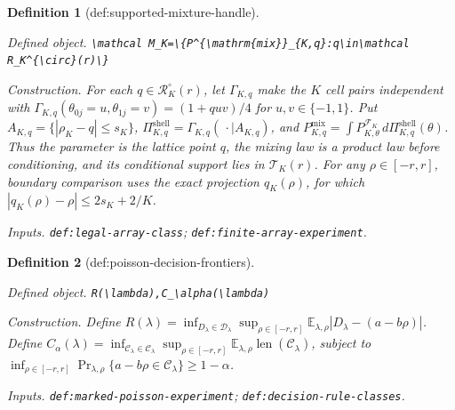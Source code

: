 \documentclass{article}
\newtheorem{definition}{Definition}
\begin{document}
\begin{definition}[def:supported-mixture-handle]\label{def:supported-mixture-handle}
\par\smallskip\noindent\emph{Defined object.} \texttt{\textbackslash{}\allowbreak{}mathcal M\_\allowbreak{}K=\allowbreak{}\textbackslash{}\allowbreak{}\{P\textasciicircum{}\{\textbackslash{}\allowbreak{}mathrm\{mix\}\allowbreak{}\}\allowbreak{}\_\allowbreak{}\{K,\allowbreak{}q\}\allowbreak{}:\allowbreak{}q\textbackslash{}\allowbreak{}in\textbackslash{}\allowbreak{}mathcal R\_\allowbreak{}K\textasciicircum{}\{\textbackslash{}\allowbreak{}circ\}\allowbreak{}(r)\textbackslash{}\allowbreak{}\}\allowbreak{}}
\par\smallskip\noindent\emph{Construction.} For each \(q\in\mathcal R_K^{\circ}(r)\), let \(\Gamma_{K,q}\) make the \(K\) cell pairs independent with \(\Gamma_{K,q}(\theta_{0j}=u,\theta_{1j}=v)=(1+quv)/4\) for \(u,v\in\{-1,1\}\). Put \(A_{K,q}=\{|\rho_K-q|\le s_K\}\), \(\Pi_{K,q}^{\mathrm{shell}}=\Gamma_{K,q}(\,\cdot\mid A_{K,q})\), and \(P^{\mathrm{mix}}_{K,q}=\int P^{\mathcal F_K}_{K,\theta}\,d\Pi_{K,q}^{\mathrm{shell}}(\theta)\). Thus the parameter is the lattice point \(q\), the mixing law is a product law before conditioning, and its conditional support lies in \(\mathcal T_K(r)\). For any \(\rho\in[-r,r]\), boundary comparison uses the exact projection \(q_K(\rho)\), for which \(|q_K(\rho)-\rho|\le 2s_K+2/K\).
\par\smallskip\noindent\emph{Inputs.} \texttt{def:\allowbreak{}legal-\allowbreak{}array-\allowbreak{}class}; \texttt{def:\allowbreak{}finite-\allowbreak{}array-\allowbreak{}experiment}.
\end{definition}

\begin{definition}[def:poisson-decision-frontiers]\label{def:poisson-decision-frontiers}
\par\smallskip\noindent\emph{Defined object.} \texttt{R(\textbackslash{}\allowbreak{}lambda),\allowbreak{}C\_\allowbreak{}\textbackslash{}\allowbreak{}alpha(\textbackslash{}\allowbreak{}lambda)}
\par\smallskip\noindent\emph{Construction.} Define \(R(\lambda)=\inf_{D_{\lambda}\in\mathscr D_{\lambda}}\sup_{\rho\in[-r,r]}\mathbb E_{\lambda,\rho}|D_{\lambda}-(a-b\rho)|\). Define \(C_\alpha(\lambda)=\inf_{\mathcal C_\lambda\in\mathscr C_{\lambda}}\sup_{\rho\in[-r,r]}\mathbb E_{\lambda,\rho}\operatorname{len}(\mathcal C_\lambda)\), subject to \(\inf_{\rho\in[-r,r]}\Pr_{\lambda,\rho}\{a-b\rho\in\mathcal C_\lambda\}\ge1-\alpha\).
\par\smallskip\noindent\emph{Inputs.} \texttt{def:\allowbreak{}marked-\allowbreak{}poisson-\allowbreak{}experiment}; \texttt{def:\allowbreak{}decision-\allowbreak{}rule-\allowbreak{}classes}.
\end{definition}
\end{document}
